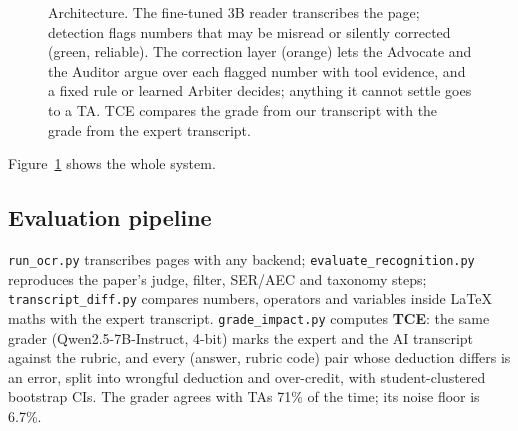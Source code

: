 \documentclass[11pt]{article}
\newcommand{\tool}[1]{\texttt{\small #1}}
\begin{document}
\begin{figure}[t]
\caption{Architecture. The fine-tuned 3B reader transcribes the page; detection flags numbers that may be misread or silently corrected (green, reliable). The correction layer (orange) lets the Advocate and the Auditor argue over each flagged number with tool evidence, and a fixed rule or learned Arbiter decides; anything it cannot settle goes to a TA. TCE compares the grade from our transcript with the grade from the expert transcript.}
\label{fig:arch}
\end{figure}

Figure~\ref{fig:arch} shows the whole system.

\subsection{Evaluation pipeline}
\tool{run\_ocr.py} transcribes pages with any backend; \tool{evaluate\_recognition.py} reproduces the paper's judge, filter, SER/AEC and taxonomy steps; \tool{transcript\_diff.py} compares numbers, operators and variables inside LaTeX maths with the expert transcript. \tool{grade\_impact.py} computes \textbf{TCE}: the same grader (Qwen2.5-7B-Instruct, 4-bit) marks the expert and the AI transcript against the rubric, and every (answer, rubric code) pair whose deduction differs is an error, split into wrongful deduction and over-credit, with student-clustered bootstrap CIs. The grader agrees with TAs 71\% of the time; its noise floor is 6.7\%.
\end{document}
